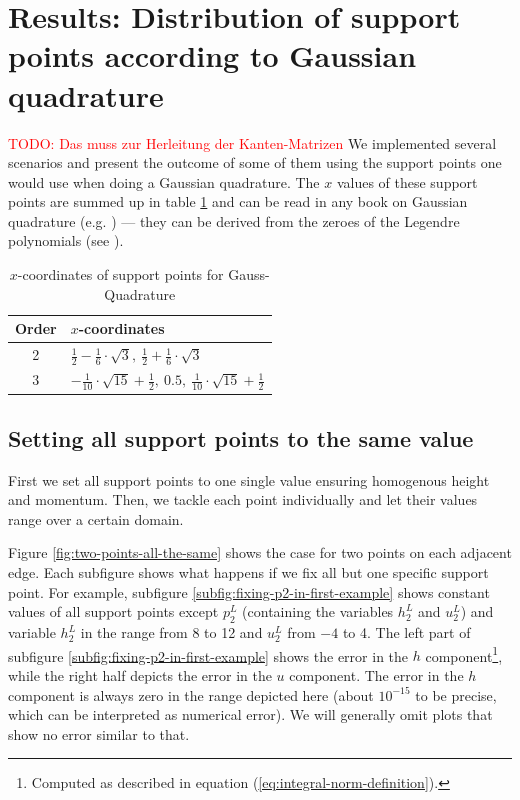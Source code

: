 \documentclass{article}
\newcommand{\todo}[2][]{\textcolor{red}{TODO\ifthenelse{\equal{#1}{}}{}{[#1]}: #2}}
\begin{document}
\section{Results: Distribution of support points according to Gaussian quadrature}
\label{sec:results}
\todo{Das muss zur Herleitung der Kanten-Matrizen}
We implemented several scenarios and present the outcome of some of them using the support points one would use when doing a Gaussian quadrature. The $x$ values of these support points are summed up in table \ref{tab:x-coordinates-gauss-quadrature} and can be read in any book on Gaussian quadrature (e.g. \cite{hans2009schwarz}) --- they can be derived from the zeroes of the Legendre polynomials (see \cite{abramowitzstegun1964handbook}).

\begin{table}[ht]
  \renewcommand\arraystretch{1.5}
  \centering
  \begin{tabular}[ht]{cl}
    Order & $x$-coordinates \\
    \hline
    2 & $\frac{1}{2}-\frac{1}{6}\cdot \sqrt{3},\  \frac{1}{2}+\frac{1}{6}\cdot \sqrt{3}$ \\
    3 & $-\frac{1}{10}\cdot \sqrt{15}+\frac{1}{2} ,\  0.5,\  \frac{1}{10}\cdot \sqrt{15}+\frac{1}{2}$ \\
    \hline
  \end{tabular}
  \caption{$x$-coordinates of support points for Gauss-Quadrature}
  \label{tab:x-coordinates-gauss-quadrature}
\end{table}

\subsection{Setting all support points to the same value}
\label{sec:setting-all-support-points-to-the-same-value}

First we set all support points to one single value ensuring homogenous height and momentum. Then, we tackle each point individually and let their values range over a certain domain.



Figure \ref{fig:two-points-all-the-same} shows the case for two points on each adjacent edge. Each subfigure shows what happens if we fix all but one specific support point. For example, subfigure \ref{subfig:fixing-p2-in-first-example} shows constant values of all support points except $p_2^L$ (containing the variables $h_2^L$ and $u_2^L$) and variable $h_2^L$ in the range from 8 to 12 and $u_2^L$ from $-4$ to 4.
The left part of subfigure \ref{subfig:fixing-p2-in-first-example} shows the error in the $h$ component\footnote{Computed as described in equation (\ref{eq:integral-norm-definition}).}, while the right half depicts the error in the $u$ component.
The error in the $h$ component is always zero in the range depicted here (about $10^{-15}$ to be precise, which can be interpreted as numerical error). We will generally omit plots that show no error similar to that.
\end{document}
